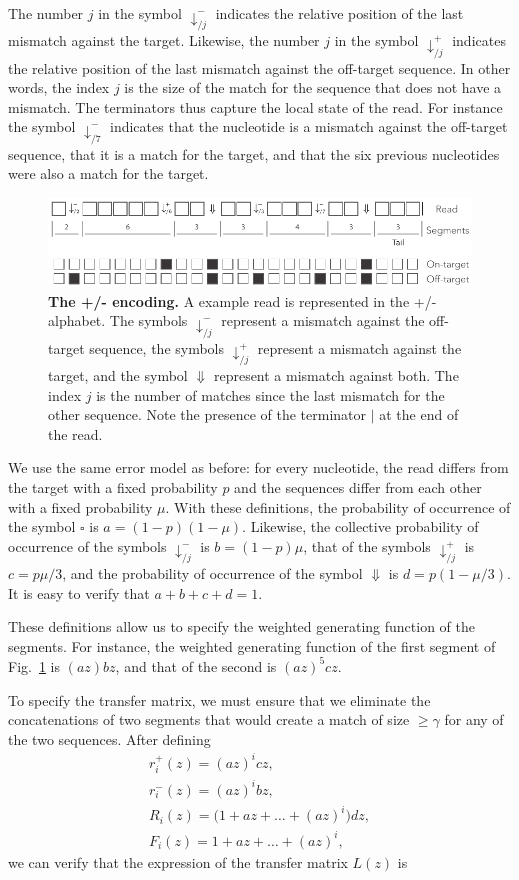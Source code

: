 \documentclass{article}
\begin{document}
The number $j$ in the symbol $\downarrow_{/j}^-$ indicates the relative
position of the last mismatch against the target. Likewise, the number $j$
in the symbol $\downarrow_{/j}^+$ indicates the relative position of the
last mismatch against the off-target sequence. In other words, the index
$j$ is the size of the match for the sequence that does not have a
mismatch. The terminators thus capture the local state of the read. For
instance the symbol $\downarrow_{/7}^-$ indicates that the nucleotide is a
mismatch against the off-target sequence, that it is a match for the
target, and that the six previous nucleotides were also a match for the
target.

\begin{figure}[h]
\centering
\includegraphics[scale=0.85]{sketch_dual.pdf}
\caption{\textbf{The +/- encoding.}
A example read is represented in the +/- alphabet. The symbols
$\downarrow_{/j}^-$ represent a mismatch against the off-target sequence,
the symbols $\downarrow_{/j}^+$ represent a mismatch against the target,
and the symbol $\Downarrow$ represent a mismatch against both. The index
$j$ is the number of matches since the last mismatch for the other
sequence. Note the presence of the terminator $|$ at the end of the read.
}
\label{fig:dual}
\end{figure}

We use the same error model as before: for every nucleotide, the read
differs from the target with a fixed probability $p$ and the sequences
differ from each other with a fixed probability $\mu$. With these
definitions, the probability of occurrence of the symbol $\square$ is $a =
(1-p)(1-\mu)$. Likewise, the collective probability of occurrence of the
symbols $\downarrow_{/j}^-$ is $b = (1-p)\mu$, that of the symbols
$\downarrow_{/j}^+$ is $c = p\mu/3$, and the probability of occurrence of
the symbol $\Downarrow$ is $d = p(1-\mu/3)$. It is easy to verify that
$a+b+c+d=1$.

These definitions allow us to specify the weighted generating function of
the segments. For instance, the weighted generating function of the
first segment of Fig.~\ref{fig:dual} is $(az)bz$, and that of the second is
$(az)^5cz$.

To specify the transfer matrix, we must ensure that we eliminate
the concatenations of two segments that would create a match of size $\geq
\gamma$ for any of the two sequences. After defining
\begin{equation*}
\begin{gathered}
r_i^+(z) = (az)^icz, \\
r_i^-(z) = (az)^ibz, \\
R_i(z) = \big( 1 + az + \ldots + (az)^i \big)dz, \\
F_i(z) = 1 + az + \ldots + (az)^i,
\end{gathered}
\end{equation*}
we can verify that the expression of the transfer matrix $L(z)$ is
\end{document}
